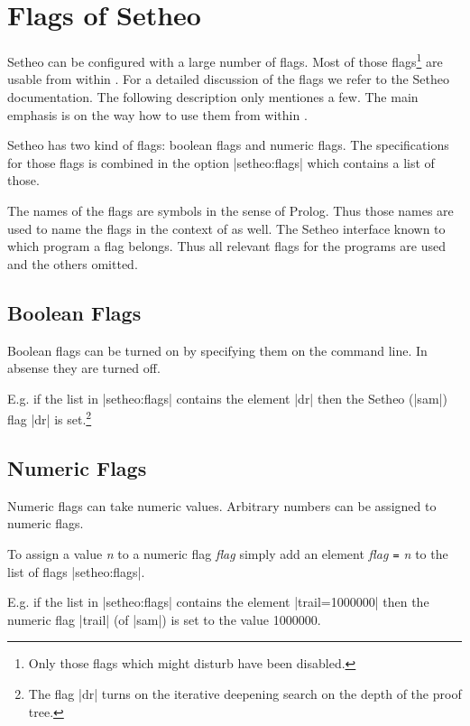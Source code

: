 \section{Flags of Setheo}\label{setheo:flags}

Setheo can be configured with a large number of flags. Most of those
flags\footnote{Only those flags which might disturb \ProTop{} have been
  disabled.} are usable from within \ProTop. For a detailed discussion of the
flags we refer to the Setheo documentation. The following description only
mentiones a few. The main emphasis is on the way how to use them from within
\ProTop.

Setheo has two kind of flags: boolean flags and numeric flags. The
specifications for those flags is combined in the option |setheo:flags| which
contains a list of those.

The names of the flags are symbols in the sense of Prolog. Thus those names
are used to name the flags in the context of \ProTop{} as well. The Setheo
interface known to which program a flag belongs. Thus all relevant flags for
the programs are used and the others omitted.


\subsection{Boolean Flags}

Boolean flags can be turned on by specifying them on the command line. In
absense they are turned off.

E.g. if the list in |setheo:flags| contains the element |dr| then the Setheo
(|sam|) flag |dr| is set.\footnote{The flag |dr| turns on the iterative
  deepening search on the depth of the proof tree.}


\subsection{Numeric Flags}

Numeric flags can take numeric values. Arbitrary numbers can be assigned to
numeric flags.

To assign a value {\em n}\/ to a numeric flag {\em flag}\/ simply add an
element {\em flag {\tt=} n} to the list of flags |setheo:flags|.

E.g. if the list in |setheo:flags| contains the element |trail=1000000| then
the numeric flag |trail| (of |sam|) is set to the value 1000000.


